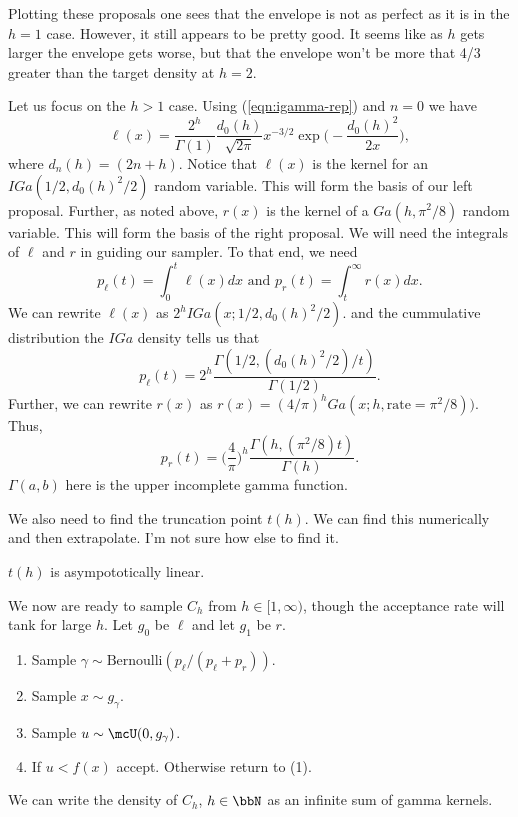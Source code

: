 \documentclass[12pt]{article}
\begin{document}
Plotting these proposals one sees that the envelope is not as perfect as it is
in the $h=1$ case.  However, it still appears to be pretty good.  It seems like
as $h$ gets larger the envelope gets worse, but that the envelope won't be more
that 4/3 greater than the target density at $h=2$.

Let us focus on the $h > 1$ case.  Using (\ref{eqn:igamma-rep}) and $n=0$ we
have
\[
\ell(x) = \frac{2^h}{\Gamma(1)} \frac{d_0(h)}{\sqrt{2 \pi}} x^{-3/2} 
\exp \Big( - \frac{d_0(h)^2}{2 x} \Big),
\]
where $d_n(h) = (2 n + h)$.  Notice that $\ell(x)$ is the kernel for an
$IGa(1/2, d_0(h)^2 / 2)$ random variable.  This will form the basis of our left
proposal.  Further, as noted above, $r(x)$ is the kernel of a $Ga(h, \pi^2 / 8)$
random variable.  This will form the basis of the right proposal.  We will need
the integrals of $\ell$ and $r$ in guiding our sampler.  To that end, we need
\[
p_\ell(t) = \int_0^t \ell(x) dx \text{ and } p_r(t) = \int_{t}^\infty r(x) dx.
\]
We can rewrite $\ell(x)$ as
\(
2^h IGa(x; 1/2, d_0(h)^2/2).
\)
and the cummulative distribution the $IGa$ density tells us that 
\[
p_\ell(t) = 2^h \frac{\Gamma(1/2, (d_0(h)^2/2) / t)}{\Gamma(1/2)}.
\]
Further, we can rewrite $r(x)$ as 
\(
r(x) = (4/\pi)^h Ga(x; h, \text{rate}=\pi^2/8)).
\)
Thus,
\[
p_r(t) = \Big(\frac{4}{\pi}\Big)^h \frac{\Gamma(h, (\pi^2/8) t)}{\Gamma(h)}.
\]
$\Gamma(a,b)$ here is the upper incomplete gamma function.

We also need to find the truncation point $t(h)$.  We can find this numerically
and then extrapolate.  I'm not sure how else to find it.

\begin{conjecture}
$t(h)$ is asympototically linear.
\end{conjecture}

We now are ready to sample $C_h$ from $h \in [1, \infty)$, though the acceptance
rate will tank for large $h$.  Let $g_0$ be $\ell$ and let $g_1$ be $r$.
\begin{enumerate}
\item Sample $\gamma \sim \text{Bernoulli}(p_\ell / (p_\ell + p_r))$.
\item Sample $x \sim g_\gamma$.
\item Sample $u \sim \mcU(0, g_\gamma)$.
\item If $u < f(x)$ accept.  Otherwise return to (1).
\end{enumerate}

\begin{fact}
\label{fact:sum-gamma-density}
  We can write the density of $C_h$, $h \in \bbN$ as an infinite sum of gamma
  kernels.
\end{fact}
\end{document}
